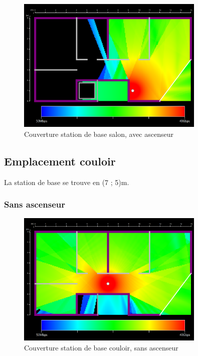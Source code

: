 \begin{figure}[H]
    \centering
    \includegraphics[width=0.8\textwidth]{latex/images/highres-with-lift.png}
    \caption{Couverture station de base salon, avec ascenseur}
    \label{fig:simu-emplacement-defaut-avecasc}
\end{figure}

\subsection{Emplacement couloir}
La station de base se trouve en (7 ; 5)m.

\subsubsection{Sans ascenseur}

\begin{figure}[H]
    \centering
    \includegraphics[width=0.8\textwidth]{latex/images/highres-couloir-without-lift.png}
    \caption{Couverture station de base couloir, sans ascenseur}
    \label{fig:simu-emplacement-couloir-sansasc}
\end{figure}
